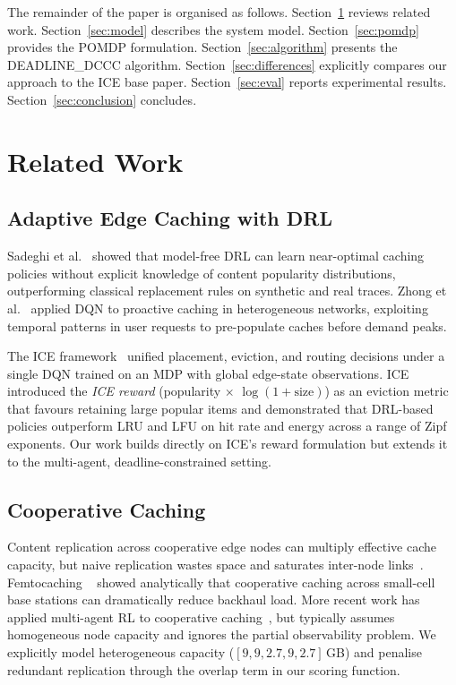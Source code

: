 \documentclass[conference]{IEEEtran}
\begin{document}
The remainder of the paper is organised as follows.  Section~\ref{sec:related}
reviews related work.  Section~\ref{sec:model} describes the system
model.  Section~\ref{sec:pomdp} provides the POMDP formulation.
Section~\ref{sec:algorithm} presents the DEADLINE\_DCCC algorithm.
Section~\ref{sec:differences} explicitly compares our approach to the
ICE base paper.  Section~\ref{sec:eval} reports experimental results.
Section~\ref{sec:conclusion} concludes.

\section{Related Work}
\label{sec:related}

\subsection{Adaptive Edge Caching with DRL}

Sadeghi et al.~\cite{sadeghi2019optimal} showed that model-free DRL can
learn near-optimal caching policies without explicit knowledge of
content popularity distributions, outperforming classical replacement
rules on synthetic and real traces.  Zhong et al.~\cite{zhong2020deep}
applied DQN to proactive caching in heterogeneous networks, exploiting
temporal patterns in user requests to pre-populate caches before demand
peaks.

The ICE framework~\cite{ice2022} unified placement, eviction, and
routing decisions under a single DQN trained on an MDP with global
edge-state observations.  ICE introduced the \emph{ICE reward}
(popularity $\times$ $\log(1 + \mathrm{size})$) as an eviction metric
that favours retaining large popular items and demonstrated that
DRL-based policies outperform LRU and LFU on hit rate and energy across
a range of Zipf exponents.  Our work builds directly on ICE's reward
formulation but extends it to the multi-agent, deadline-constrained
setting.

\subsection{Cooperative Caching}

Content replication across cooperative edge nodes can multiply
effective cache capacity, but naive replication wastes space and
saturates inter-node links~\cite{borst2010distributed}.  Femtocaching
~\cite{golrezaei2013femtocaching} showed analytically that cooperative
caching across small-cell base stations can dramatically reduce
backhaul load.  More recent work has applied multi-agent RL to
cooperative caching~\cite{zheng2018heterogeneous}, but typically
assumes homogeneous node capacity and ignores the partial observability
problem.  We explicitly model heterogeneous capacity
($[9,9,2.7,9,2.7]$\,GB) and penalise redundant replication through the
overlap term in our scoring function.
\end{document}

